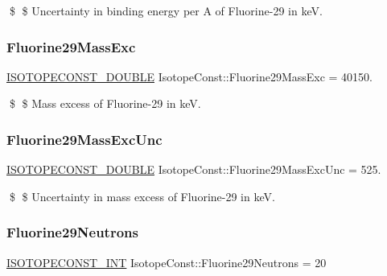 \$ \$ Uncertainty in binding energy per A of Fluorine-\/29 in keV. \mbox{\label{group___isotope_const-_fluorine-_f29_ga1de14b9e615760831c29ec09079b2bb9}} 
\subsubsection{\texorpdfstring{Fluorine29\+Mass\+Exc}{Fluorine29MassExc}}
{\footnotesize\ttfamily \mbox{\hyperlink{group___isotope_const-_macros_ga8f45a7272ce02c0b4c65c44636ed719a}{I\+S\+O\+T\+O\+P\+E\+C\+O\+N\+S\+T\+\_\+\+D\+O\+U\+B\+LE}} Isotope\+Const\+::\+Fluorine29\+Mass\+Exc = 40150.}

\$ \$ Mass excess of Fluorine-\/29 in keV. \mbox{\label{group___isotope_const-_fluorine-_f29_ga5bf36ee6493c48768cc974720fd146b3}} 
\subsubsection{\texorpdfstring{Fluorine29\+Mass\+Exc\+Unc}{Fluorine29MassExcUnc}}
{\footnotesize\ttfamily \mbox{\hyperlink{group___isotope_const-_macros_ga8f45a7272ce02c0b4c65c44636ed719a}{I\+S\+O\+T\+O\+P\+E\+C\+O\+N\+S\+T\+\_\+\+D\+O\+U\+B\+LE}} Isotope\+Const\+::\+Fluorine29\+Mass\+Exc\+Unc = 525.}

\$ \$ Uncertainty in mass excess of Fluorine-\/29 in keV. \mbox{\label{group___isotope_const-_fluorine-_f29_gabb861ae33edf155036f3ac85b320b2b1}} 
\subsubsection{\texorpdfstring{Fluorine29\+Neutrons}{Fluorine29Neutrons}}
{\footnotesize\ttfamily \mbox{\hyperlink{group___isotope_const-_macros_ga5f18360b3e99483a35c32d789e62621c}{I\+S\+O\+T\+O\+P\+E\+C\+O\+N\+S\+T\+\_\+\+I\+NT}} Isotope\+Const\+::\+Fluorine29\+Neutrons = 20}

